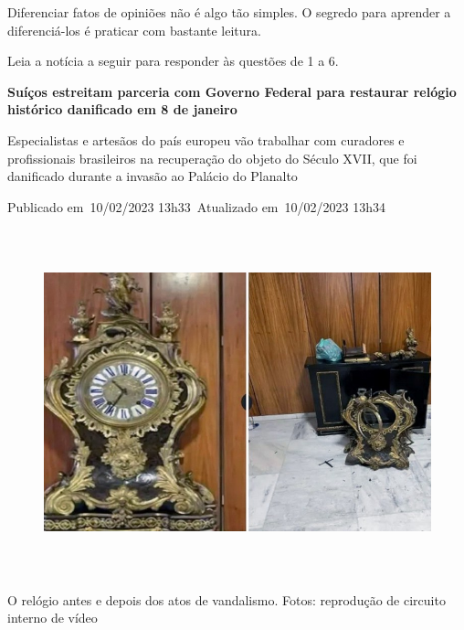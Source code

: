 \begin{itemize}
\begin{itemize}
{\begin{itemize}
\begin{itemize}
{Diferenciar fatos de opiniões não é algo tão simples. O segredo para
aprender a diferenciá-los é praticar com bastante leitura.
}


Leia a notícia a seguir para responder às questões de 1 a 6.


\textbf{Suíços estreitam parceria com Governo Federal para restaurar
relógio histórico danificado em 8 de janeiro}

Especialistas e artesãos do país europeu vão trabalhar com curadores e
profissionais brasileiros na recuperação do objeto do Século XVII, que
foi danificado durante a invasão ao Palácio do Planalto

Publicado em~10/02/2023 13h33~Atualizado em~10/02/2023 13h34

\begin{figure}
\centering
\includegraphics[width=5.90556in,height=3.93681in]{./_SAEB_9_POR/media/image8.jpeg}
\caption{}
\end{figure}

O relógio antes e depois dos atos de vandalismo. Fotos: reprodução de
circuito interno de vídeo


\end{itemize}
\end{itemize}}
\end{itemize}
\end{itemize}
